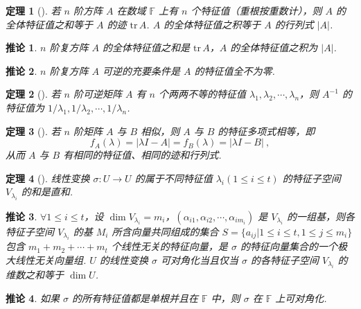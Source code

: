\documentclass[zihao=-4,UTF8,linespread=1.8,nothm]{aytony_base}
\newtheorem{theorem}{\indent 定理}[subsection]
\newtheorem*{corollary}{\indent 推论}
\begin{document}
\begin{theorem}[]
    若 $n$ 阶方阵 $A$ 在数域 $\mathbb{F}$ 上有 $n$ 个特征值（重根按重数计），则 $A$ 的全体特征值之和等于 $A$ 的迹 $\mathrm{tr}\,A$. $A$ 的全体特征值之积等于 $A$ 的行列式 $|A|$.
\end{theorem}

\begin{corollary}
    $n$ 阶复方阵 $A$ 的全体特征值之和是 $\mathrm{tr}\,A$，$A$ 的全体特征值之积为 $|A|$.
\end{corollary}

\begin{corollary}
    $n$ 阶复方阵 $A$ 可逆的充要条件是 $A$ 的特征值全不为零.
\end{corollary}

\begin{theorem}[]
    若 $n$ 阶可逆矩阵 $A$ 有 $n$ 个两两不等的特征值 ${\lambda}_1, {\lambda}_2, \cdots, {\lambda}_{n}$，则 $A^{-1}$ 的特征值为 $1/{\lambda}_1, 1/{\lambda}_2, \cdots, 1/{\lambda}_{n}$.
\end{theorem}

\begin{theorem}[]
    若 $n$ 阶矩阵 $A$ 与 $B$ 相似，则 $A$ 与 $B$ 的特征多项式相等，即 $$
        f_A(\lambda) = |\lambda I - A| = f_B(\lambda) = |\lambda I - B|\ ,
    $$ 从而 $A$ 与 $B$ 有相同的特征值、相同的迹和行列式.
\end{theorem}

\begin{theorem}[]
    线性变换 $\sigma: U \to U$ 的属于不同特征值 $\lambda_i(1 \leqslant i \leqslant t)$ 的特征子空间 $V_{\lambda_i}$ 的和是直和.
\end{theorem}

\begin{corollary}
    $\forall 1 \leqslant i \leqslant t$，设 $\dim V_{\lambda_i} = m_i$，$({\alpha}_{i1}, {\alpha}_{i2}, \cdots, {\alpha}_{i{m_i}})$ 是 $V_{\lambda_i}$ 的一组基，则各特征子空间 $V_{\lambda_i}$ 的基 $M_i$ 所含向量共同组成的集合 $S = \{a_{ij}|1 \leqslant i \leqslant t, 1 \leqslant j \leqslant m_i \}$ 包含 $m_1 + m_2 + \cdots + m_t$ 个线性无关的特征向量，是 $\sigma$ 的特征向量集合的一个极大线性无关向量组. $U$ 的线性变换 $\sigma$ 可对角化当且仅当 $\sigma$ 的各特征子空间 $V_{\lambda_i}$ 的维数之和等于 $\dim U$.
\end{corollary}

\begin{corollary}
    如果 $\sigma$ 的所有特征值都是单根并且在 $\mathbb{F}$ 中，则 $\sigma$ 在 $\mathbb{F}$ 上可对角化.
\end{corollary}
\end{document}

